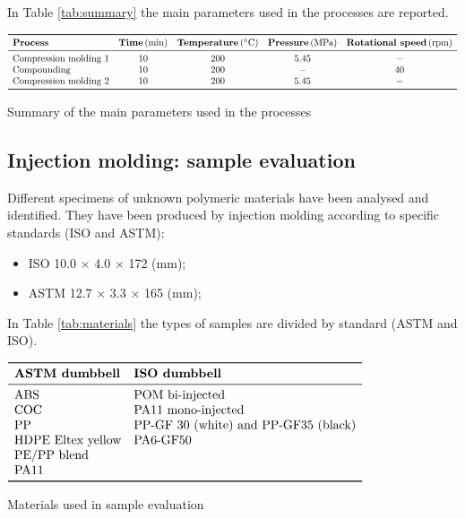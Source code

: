 \documentclass[a4paper, 11pt]{article}
\begin{document}
\newpage

In Table \ref{tab:summary} the main parameters used in the processes are reported.

\begin{table}[htp]
\centering
$
\begin{array}{lcccc}
\toprule
\textbf{Process} & \textbf{Time}\,\text{(min)}  & \textbf{Temperature}\,(^\circ\text{C}) & \textbf{Pressure}\,\text{(MPa)} & \textbf{Rotational speed}\,\text{(rpm)}\\
\midrule
\text{Compression molding 1} & 10 & 200 & 5.45 & -\\
\text{Compounding} & 10 & 200 &  - & 40 \\
\text{Compression molding 2} & 10 & 200 & 5.45 & -\\
\bottomrule
\end{array}
$
\caption{Summary of the main parameters used in the processes}
\label{tab:summary}
\end{table}

\subsection{Injection molding: sample evaluation}
Different specimens of unknown polymeric materials have been analysed and identified. They have been produced by injection molding according to specific standards (ISO and ASTM):
\begin{itemize}
\item ISO 10.0 $\times$ 4.0 $\times$ 172 (mm);
\item ASTM 12.7 $\times$ 3.3 $\times$ 165 (mm);
\end{itemize}

In Table \ref{tab:materials} the types of samples are divided by standard (ASTM and ISO). 
\begin{table}[htp]
	\centering
	$
	\begin{array}{ll}
	\toprule
	\textbf{ASTM dumbbell} & \textbf{ISO dumbbell}  \\
	\midrule
	\text{ABS} & \text{POM bi-injected}\\
        \text{COC} & \text{PA11 mono-injected}\\
	\text{PP} & \text{PP-GF 30 (white) and PP-GF35 (black)}\\
	\text{HDPE Eltex yellow} & \text{PA6-GF50}\\
	\text{PE/PP blend} & \text{}\\
	\text{PA11} & \text{}\\
	\bottomrule
	\end{array}
	$
	\caption{Materials used in sample evaluation}
	\label{tab:materials}
\end{table}
\end{document}
